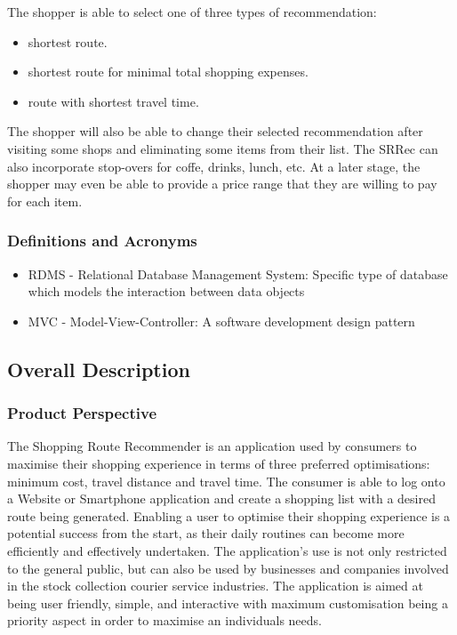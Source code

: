 \documentclass[10pt,twocolumn]{witseiepaper}
\begin{document}
			The shopper is able to select one of three types of recommendation:
			\begin{itemize}
				\item shortest route.
				\item shortest route for minimal total shopping expenses.
				\item route with shortest travel time.
			\end{itemize}
			
			The shopper will also be able to change their selected recommendation after visiting some shops and eliminating some items from their list. The SRRec can also incorporate stop-overs for coffe, drinks, lunch, etc. At a later stage, the shopper may even be able to provide a price range that they are willing to pay for each item.
			
		\subsubsection{Definitions and Acronyms}
		
			\begin{itemize}
				\item RDMS - Relational Database Management System: Specific type of database which models the interaction between data objects
				\item MVC - Model-View-Controller: A software development design pattern
			\end{itemize}
		
	\subsection{Overall Description}
		
		\subsubsection{Product Perspective}
		
			The Shopping Route Recommender is an application used by consumers to maximise their shopping experience in terms of three preferred optimisations: minimum cost, travel distance and travel time. The consumer is able to log onto a Website or Smartphone application and create a shopping list with a desired route being generated.  Enabling a user to optimise their shopping experience is a potential success from the start, as their daily routines can become more efficiently and effectively undertaken. The application's use is not only restricted to the general public, but can also be used by businesses and companies involved in the stock collection courier service industries. The application is aimed at being user friendly, simple, and interactive with maximum customisation being a priority aspect in order to maximise an individuals needs. 
		
\end{document}
